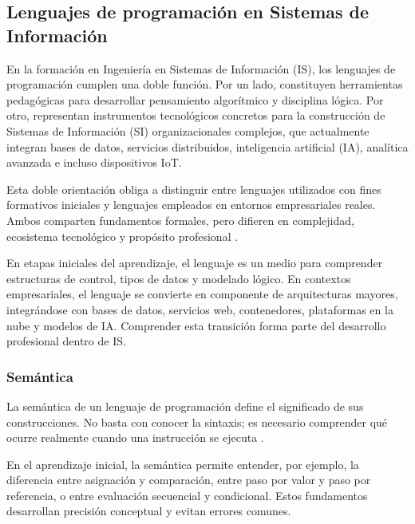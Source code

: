 \documentclass[12pt,twoside]{book}
\begin{document}
				\subsection{Lenguajes de programación en Sistemas de Información}
					\noindent
					En la formación en Ingeniería en Sistemas de Información (IS), los lenguajes de programación cumplen una doble función. Por un lado, constituyen herramientas pedagógicas para desarrollar pensamiento algorítmico y disciplina lógica. Por otro, representan instrumentos tecnológicos concretos para la construcción de Sistemas de Información (SI) organizacionales complejos, que actualmente integran bases de datos, servicios distribuidos, inteligencia artificial (IA), analítica avanzada e incluso dispositivos IoT.
					
					Esta doble orientación obliga a distinguir entre lenguajes utilizados con fines formativos iniciales y lenguajes empleados en entornos empresariales reales. Ambos comparten fundamentos formales, pero difieren en complejidad, ecosistema tecnológico y propósito profesional \cite{Sommerville2015Software,Pressman2019Software,SWEBOK2025Guide}.
					
					En etapas iniciales del aprendizaje, el lenguaje es un medio para comprender estructuras de control, tipos de datos y modelado lógico. En contextos empresariales, el lenguaje se convierte en componente de arquitecturas mayores, integrándose con bases de datos, servicios web, contenedores, plataformas en la nube y modelos de IA. Comprender esta transición forma parte del desarrollo profesional dentro de IS.
					
					\subsubsection{Semántica}
						\noindent
						La semántica de un lenguaje de programación define el significado de sus construcciones. No basta con conocer la sintaxis; es necesario comprender qué ocurre realmente cuando una instrucción se ejecuta \cite{Sebesta2018Concepts,Sommerville2015Software}. 
						
						En el aprendizaje inicial, la semántica permite entender, por ejemplo, la diferencia entre asignación y comparación, entre paso por valor y paso por referencia, o entre evaluación secuencial y condicional. Estos fundamentos desarrollan precisión conceptual y evitan errores comunes.
						
\end{document}
